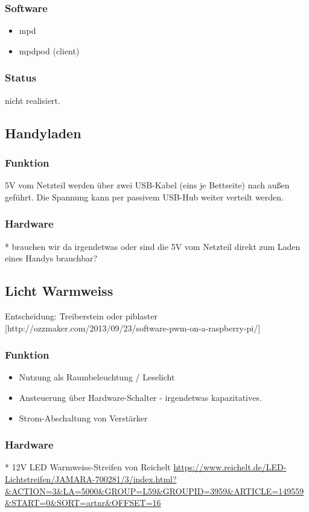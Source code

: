 \documentclass[a4paper,twoside,titlepage,normalheadings,tocleft,bibtotoc]{scrartcl}
\begin{document}
\begin{itemize}
\subsubsection{Software}
\begin{itemize}
\item mpd
\item mpdpod (client)
\end{itemize}

\subsubsection{Status}
nicht realisiert.

\subsection{Handyladen}
\subsubsection{Funktion}
5V vom Netzteil werden über zwei USB-Kabel (eins je Bettseite) nach außen geführt. Die Spannung kann per passivem USB-Hub weiter verteilt werden.

\subsubsection{Hardware}
* brauchen wir da irgendetwas oder sind die 5V vom Netzteil direkt zum Laden
eines Handys brauchbar?

\subsection{Licht Warmweiss}
Entscheidung: Treiberstein oder piblaster [http://ozzmaker.com/2013/09/23/software-pwm-on-a-raspberry-pi/]
\subsubsection{Funktion}
\begin{itemize}
\item Nutzung als Raumbeleuchtung / Leselicht
\item Ansteuerung über Hardware-Schalter - irgendetwas kapazitatives.
\item Strom-Abschaltung von Verstärker
\end{itemize}

\subsubsection{Hardware}
* 12V LED Warmweiss-Streifen von Reichelt \url{https://www.reichelt.de/LED-Lichtstreifen/JAMARA-700281/3/index.html?&ACTION=3&LA=5000&GROUP=L59&GROUPID=3959&ARTICLE=149559&START=0&SORT=artnr&OFFSET=16}


\end{itemize}
\end{document}
